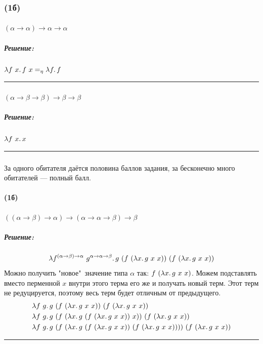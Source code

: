\documentclass{article}
\newenvironment{proof}{\subparagraph{\hspace{-1em}Решение:\newline}\-}{\par\noindent\rule{\textwidth}{0.4pt}}
\newcommand{\ap}{~}
\newcommand{\eqeta}{=_\eta}
\begin{document}
    \subsubsection{(1б)}

    \paragraph{} $(\alpha \to \alpha) \to \alpha \to \alpha$

    \begin{proof}
        $\lambda f~x\ldotp f \ap x \eqeta \lambda f\ldotp f$
    \end{proof}

    \paragraph{} $(\alpha \to \beta \to \beta) \to \beta \to \beta$

    \begin{proof}
        $\lambda f~x\ldotp x$
    \end{proof}

    \subsubsection{}

    За одного обитателя даётся половина баллов задания, за бесконечно много обитателей --- полный балл.

    \paragraph{(1б)} $((\alpha \to \beta) \to \alpha) \to (\alpha \to \alpha \to \beta) \to \beta$

    \begin{proof}
        \[ \lambda f^{(\alpha \to \beta) \to \alpha}~g^{\alpha \to \alpha \to \beta}\ldotp g \ap (f \ap (\lambda x\ldotp g \ap x \ap x)) \ap (f \ap (\lambda x\ldotp g \ap x \ap x)) \]
        Можно получить "новое"\ значение типа \(\alpha\) так: \(f \ap (\lambda x\ldotp g \ap x \ap x)\). Можем подставлять вместо перменной \(x\) внутри этого терма его же и получать новый терм. Этот терм не редуцируется, поэтому весь терм будет отличным от предыдущего.
        \begin{align}
            \lambda f~g\ldotp g \ap (f \ap (\lambda x\ldotp g & \ap x \ap x)) \ap (f \ap (\lambda x\ldotp g \ap x \ap x)) \\
            \lambda f~g\ldotp g \ap (f \ap (\lambda x\ldotp g & \ap (f \ap (\lambda x\ldotp g \ap x \ap x)) \ap x)) \ap (f \ap (\lambda x\ldotp g \ap x \ap x)) \\
            \lambda f~g\ldotp g \ap (f \ap (\lambda x\ldotp g & \ap (f \ap (\lambda x\ldotp g \ap x \ap x)) \ap (f \ap (\lambda x\ldotp g \ap x \ap x)))) \ap (f \ap (\lambda x\ldotp g \ap x \ap x))
        \end{align}
    \end{proof}
\end{document}
